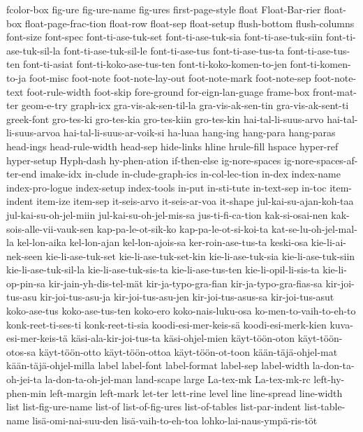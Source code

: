 {fcolor-box
fig-ure
fig-ure-name
fig-ures
first-page-style
float
Float-Bar-rier
float-box
float-page-frac-tion
float-row
float-sep
float-setup
flush-bottom
flush-columns
font-size
font-spec
font-ti-ase-tuk-set
font-ti-ase-tuk-sia
font-ti-ase-tuk-siin
font-ti-ase-tuk-sil-la
font-ti-ase-tuk-sil-le
font-ti-ase-tus
font-ti-ase-tus-ta
font-ti-ase-tus-ten
font-ti-asiat
font-ti-koko-ase-tus-ten
font-ti-koko-komen-to-jen
font-ti-komen-to-ja
foot-misc
foot-note
foot-note-lay-out
foot-note-mark
foot-note-sep
foot-note-text
foot-rule-width
foot-skip
fore-ground
for-eign-lan-guage
frame-box
front-mat-ter
geom-e-try
graph-icx
gra-vis-ak-sen-til-la
gra-vis-ak-sen-tin
gra-vis-ak-sent-ti
greek-font
gro-tes-ki
gro-tes-kia
gro-tes-kiin
gro-tes-kin
hai-tal-li-suus-arvo
hai-tal-li-suus-arvoa
hai-tal-li-suus-ar-voik-si
ha-luaa
hang-ing
hang-para
hang-paras
head-ings
head-rule-width
head-sep
hide-links
hline
hrule-fill
hspace
hyper-ref
hyper-setup
Hyph-dash
hy-phen-ation
if-then-else
ig-nore-spaces
ig-nore-spaces-af-ter-end
imake-idx
in-clude
in-clude-graph-ics
in-col-lec-tion
in-dex
index-name
index-pro-logue
index-setup
index-tools
in-put
in-sti-tute
in-text-sep
in-toc
item-indent
item-ize
item-sep
it-seis-arvo
it-seis-ar-voa
it-shape
jul-kai-su-ajan-koh-taa
jul-kai-su-oh-jel-miin
jul-kai-su-oh-jel-mis-sa
jus-ti-fi-ca-tion
kak-si-osai-nen
kak-sois-alle-vii-vauk-sen
kap-pa-le-ot-sik-ko
kap-pa-le-ot-si-koi-ta
kat-se-lu-oh-jel-mal-la
kel-lon-aika
kel-lon-ajan
kel-lon-ajois-sa
ker-roin-ase-tus-ta
keski-osa
kie-li-ai-nek-seen
kie-li-ase-tuk-set
kie-li-ase-tuk-set-kin
kie-li-ase-tuk-sia
kie-li-ase-tuk-siin
kie-li-ase-tuk-sil-la
kie-li-ase-tuk-sis-ta
kie-li-ase-tus-ten
kie-li-opil-li-sis-ta
kie-li-op-pin-sa
kir-jain-yh-dis-tel-mät
kir-ja-typo-gra-fian
kir-ja-typo-gra-fias-sa
kir-joi-tus-asu
kir-joi-tus-asu-ja
kir-joi-tus-asu-jen
kir-joi-tus-asus-sa
kir-joi-tus-asut
koko-ase-tus
koko-ase-tus-ten
koko-ero
koko-nais-luku-osa
ko-men-to-vaih-to-eh-to
konk-reet-ti-ses-ti
konk-reet-ti-sia
koodi-esi-mer-keis-sä
koodi-esi-merk-kien
kuva-esi-mer-keis-tä
käsi-ala-kir-joi-tus-ta
käsi-ohjel-mien
käyt-töön-oton
käyt-töön-otos-sa
käyt-töön-otto
käyt-töön-ottoa
käyt-töön-ot-toon
kään-täjä-ohjel-mat
kään-täjä-ohjel-milla
label
label-font
label-format
label-sep
label-width
la-don-ta-oh-jei-ta
la-don-ta-oh-jel-man
land-scape
large
La-tex-mk
La-tex-mk-rc
left-hy-phen-min
left-margin
left-mark
let-ter
lett-rine
level
line
line-spread
line-width
list
list-fig-ure-name
list-of
list-of-fig-ures
list-of-tables
list-par-indent
list-table-name
lisä-omi-nai-suu-den
lisä-vaih-to-eh-toa
lohko-lai-naus-ympä-ris-töt
}
